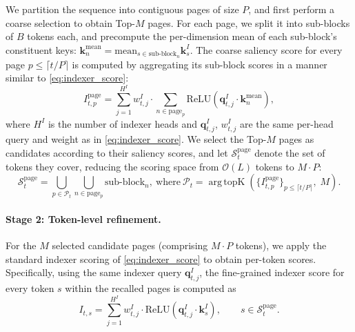 \documentclass{article}
\newcommand{\mean}{\text{mean}}
\begin{document}
We partition the sequence into contiguous pages of size $P$, and first perform a coarse selection to obtain Top-$M$ pages. For each page, we split it into sub-blocks of $B$ tokens each, and precompute the per-dimension mean of each sub-block's constituent keys: $\mathbf{k}_{n}^{\mean} = \mean_{s \in \text{sub-block}_n} \mathbf{k}_{s}^I$. The coarse saliency score for every page $p \leq \lceil t/P \rceil $ is computed by aggregating its sub-block scores in a manner similar to \cref{eq:indexer_score}:
\begin{equation}
\label{eq:block_score}
I_{t,p}^{\text{page}} = \sum_{j=1}^{H^I} w_{t,j}^I \cdot \sum_{n \in \text{page}_p} \mathrm{ReLU}\!\left(\mathbf{q}_{t,j}^I \cdot \mathbf{k}_{n}^{\mean}\right),
\end{equation}
where $H^I$ is the number of indexer heads and $\mathbf{q}_{t,j}^I$, $w_{t,j}^I$ are the same per-head query and weight as in \cref{eq:indexer_score}. We select the Top-$M$ pages as candidates according to their saliency scores, and let $\mathcal{S}_t^{\text{page}}$ denote the set of tokens they cover, reducing the scoring space from $\mathcal{O}(L)$ tokens to $M \cdot P$:
\begin{equation}
\label{eq:page_topM}
\mathcal{S}_{t}^{\text{page}} = \bigcup_{p \in \mathcal{P}_t} \bigcup_{n \in \text{page}_p} \text{sub-block}_n, ~ \text{where} ~ \mathcal{P}_t  = \mathop{\mathrm{arg\,topK}}\left(\{I_{t,p}^{\text{page}}\}_{p \leq \lceil t/P \rceil},\; M\right).
\end{equation}


\paragraph{Stage 2: Token-level refinement.}
For the $M$ selected candidate pages (comprising $M \cdot P$ tokens), we apply the standard indexer scoring of \cref{eq:indexer_score} to obtain per-token scores. Specifically, using the same indexer query $\mathbf{q}_{t,j}^I$, the fine-grained indexer score for every token $s$ within the recalled pages is computed as
\begin{equation}
\label{eq:fine_score}
I_{t,s} = \sum_{j=1}^{H^I} w_{t,j}^I \cdot \mathrm{ReLU}\!\left(\mathbf{q}_{t,j}^I \cdot \mathbf{k}_s^I\right), \qquad s \in \mathcal{S}_t^{\text{page}}.
\end{equation}
\end{document}
